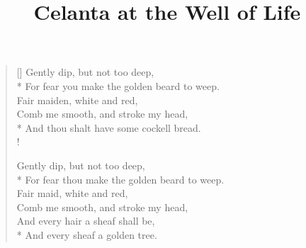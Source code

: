 \documentclass{amsart}
\title{Celanta at the Well of Life}
\begin{document}
\maketitle

\settowidth{\versewidth}{For fear you make the golden beard to weep.}
\begin{verse}[\versewidth]
    Gently dip, but not too deep,\\*
    For fear you make the golden beard to weep.\\
    Fair maiden, white and red,\\
    Comb me smooth, and stroke my head,\\*
    And thou shalt have some cockell bread.\\!

    Gently dip, but not too deep,\\*
    For fear thou make the golden beard to weep.\\
    Fair maid, white and red,\\
    Comb me smooth, and stroke my head,\\
    And every hair a sheaf shall be,\\*
    And every sheaf a golden tree.
\end{verse}
\end{document}
